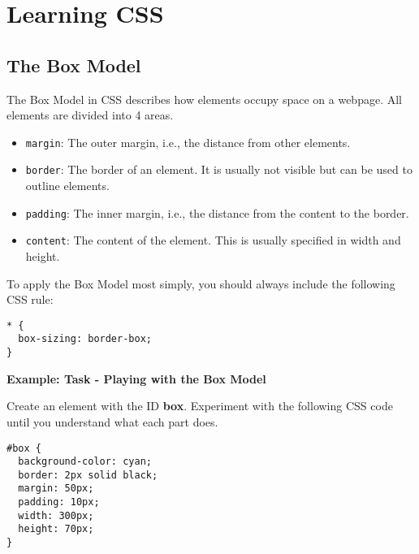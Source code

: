 \documentclass[english,11pt,a4paper]{report}
\begin{document}
\section{Learning CSS}

\subsection{The Box Model}

\begin{flushleft}
The Box Model in CSS describes how elements occupy space on a webpage. All elements are divided into 4 areas.
\end{flushleft}
\begin{itemize}
    \item \texttt{margin}: The outer margin, i.e., the distance from other elements.
    \item \texttt{border}: The border of an element. It is usually not visible but can be used to outline elements.
    \item \texttt{padding}: The inner margin, i.e., the distance from the content to the border.
    \item \texttt{content}: The content of the element. This is usually specified in width and height.
\end{itemize}
\begin{flushleft}
To apply the Box Model most simply, you should always include the following CSS rule:
\end{flushleft}
\begin{verbatim}
* {
  box-sizing: border-box;
}
\end{verbatim}
\begin{flushleft}
\textbf{Example: Task - Playing with the Box Model}
\end{flushleft}
Create an element with the ID \textbf{box}. Experiment with the following CSS code until you understand what each part does.
\begin{verbatim}
#box {
  background-color: cyan;
  border: 2px solid black;
  margin: 50px;
  padding: 10px;
  width: 300px;
  height: 70px;
}
\end{verbatim}
\end{document}
